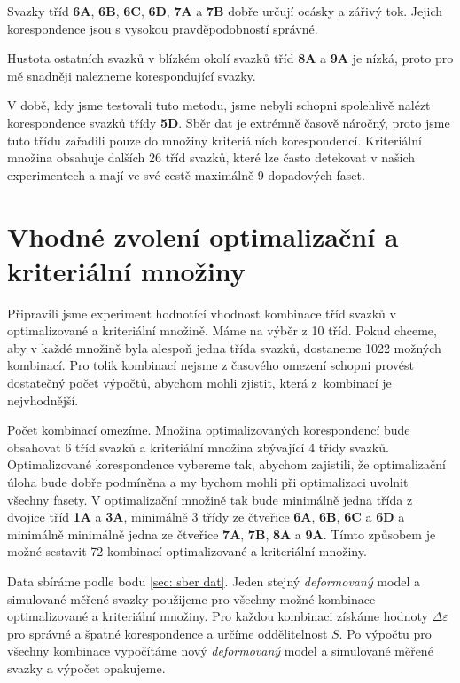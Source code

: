 Svazky tříd \textbf{6A}, \textbf{6B}, \textbf{6C}, \textbf{6D}, \textbf{7A} a \textbf{7B} dobře určují ocásky a zářivý tok. Jejich korespondence jsou s vysokou pravděpodobností správné. 

Hustota ostatních svazků v blízkém okolí svazků tříd \textbf{8A} a \textbf{9A} je nízká, proto pro mě snadněji nalezneme korespondující svazky. 

V době, kdy jsme testovali tuto metodu, jsme nebyli schopni spolehlivě nalézt korespondence svazků třídy \textbf{5D}. Sběr dat je extrémně časově náročný, proto jsme tuto třídu zařadili pouze do množiny kriteriálních korespondencí. Kriteriální množina obsahuje dalších 26 tříd svazků, které lze často detekovat v našich experimentech a mají ve své cestě maximálně 9 dopadových faset. 


\section{Vhodné zvolení optimalizační a kriteriální množiny}
\label{sec: vhodnostOpt}
	Připravili jsme experiment hodnotící vhodnost kombinace tříd svazků v optimalizované a kriteriální množině. Máme na výběr z 10 tříd. Pokud chceme, aby v každé množině byla alespoň jedna třída svazků, dostaneme 1022 možných kombinací. Pro tolik kombinací nejsme z časového omezení schopni provést dostatečný počet výpočtů, abychom mohli zjistit, která z~kombinací je nejvhodnější. 

	Počet kombinací omezíme. Množina optimalizovaných korespondencí bude obsahovat 6 tříd svazků a kriteriální množina zbývající 4 třídy svazků. Optimalizované korespondence vybereme tak, abychom zajistili, že optimalizační úloha bude dobře podmíněna a my bychom mohli při optimalizaci uvolnit všechny fasety. V optimalizační množině tak bude  minimálně jedna třída z dvojice tříd \textbf{1A} a \textbf{3A}, minimálně 3 třídy ze čtveřice \textbf{6A}, \textbf{6B}, \textbf{6C} a \textbf{6D} a minimálně minimálně jedna ze čtveřice \textbf{7A}, \textbf{7B}, \textbf{8A} a \textbf{9A}. Tímto způsobem je možné sestavit 72 kombinací optimalizované a kriteriální množiny. 
	
	Data sbíráme podle bodu \ref{sec: sber dat}. Jeden stejný \textit{deformovaný} model a simulované měřené svazky použijeme pro všechny možné kombinace optimalizované a kriteriální množiny. Pro každou kombinaci získáme hodnoty $\Delta\varepsilon$ pro správné a špatné korespondence a určíme od\-dě\-li\-tel\-nost $S$. Po výpočtu pro všechny kombinace vypočítáme nový \textit{deformovaný} model a simulované měřené svazky a výpočet opakujeme. 
	
